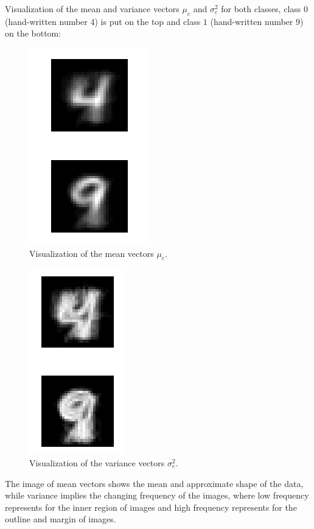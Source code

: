 \documentclass{article}
\begin{document}
Visualization of the mean and variance vectors $\mu_c$ and $\sigma_c^2$ for both classes, class $0$ (hand-written number 4) is put on the top and class $1$ (hand-written number 9) on the bottom:

\begin{figure}[H]
	\centering
	\includegraphics[scale=0.7]{figure15}
	\caption{Visualization of the mean vectors $\mu_c$.}
	\label{fig15}
\end{figure}

\begin{figure}[H]
	\centering
	\includegraphics[scale=0.7]{figure16}
	\caption{Visualization of the variance vectors $\sigma_c^2$.}
	\label{fig16}
\end{figure}

The image of mean vectors shows the mean and approximate shape of the data, while variance implies the changing frequency of the images, where low frequency represents for the inner region of images and high frequency represents for the outline and margin of images.
\end{document}
